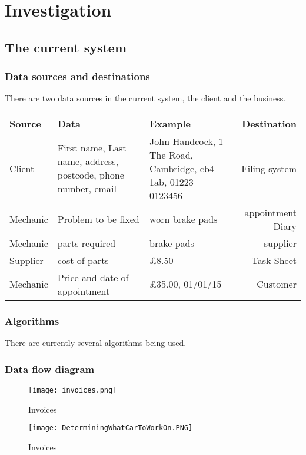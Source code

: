 \section{Investigation}

	\subsection{The current system}

	\subsubsection{Data sources and destinations}
		There are  two data sources in the current system, the client and the business.
		

\begin{tabular}{|l|p{4cm}|p{4cm}|r|}
\hline
Source & Data & Example & Destination\\ \hline
Client & First name, Last name, address, postcode, phone number, email & John Handcock, 1 The Road, Cambridge, cb4 1ab, 01223 0123456  & Filing system\\ \hline
Mechanic & Problem to be fixed & worn brake pads & appointment Diary\\ \hline
Mechanic & parts required & brake pads & supplier \\ \hline
Supplier & cost of parts & £8.50 & Task Sheet \\ \hline
Mechanic & Price and date of appointment & £35.00, 01/01/15 & Customer \\ 

\hline
\end{tabular}



	\subsubsection{Algorithms}
		There are currently several algorithms being used.
		






		


	\subsubsection{Data flow diagram}
	
	\begin{figure}[H]	
	
	\texttt{[image: invoices.png]}
    \caption{Invoices}
    
    \texttt{[image: DeterminingWhatCarToWorkOn.PNG]}
    \caption{Invoices}     
    
    \end{figure}
    
